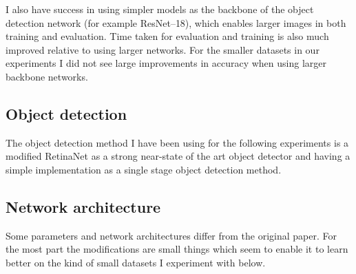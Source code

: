 I also have success in using simpler models as the backbone of the object detection network (for example ResNet--18), which enables larger images in both training and evaluation. Time taken for evaluation and training is also much improved relative to using larger networks. For the smaller datasets in our experiments I did not see large improvements in accuracy when using larger backbone networks.








\subsection {Object detection}

The object detection method I have been using for the following experiments is a modified RetinaNet \cite{Lin2017} as a strong near-state of the art object detector and having a simple implementation as a single stage object detection method. 


\subsection {Network architecture}
\label{sec:architecture}


Some parameters and network architectures differ from the original paper. For the most part the modifications are small things which seem to enable it to learn better on the kind of small datasets I experiment with below. 

